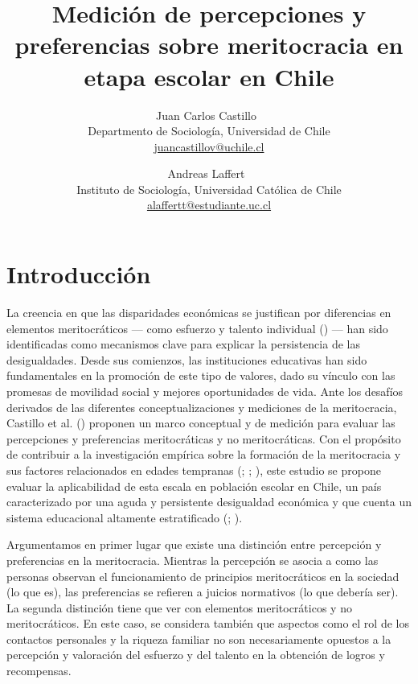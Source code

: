\documentclass[
  12pt,
  letterpaper,
]{article}
\title{Medición de percepciones y preferencias sobre meritocracia en
etapa escolar en Chile}
\author{
{\large Juan Carlos Castillo~\orcidlink{0000-0003-1265-7854}}%
 \\%
Departmento de Sociología, Universidad de Chile \\%
{\footnotesize \url{juancastillov@uchile.cl}} \and
{\large Andreas Laffert~\orcidlink{0000-0002-9008-2454}}%
 \\%
Instituto de Sociología, Universidad Católica de Chile \\%
{\footnotesize \url{alaffertt@estudiante.uc.cl}} \and
}
\date{}
\newcommand{\published}[1]{%
   \gdef\puB{#1}}
\newcommand{\puB}{}
\begin{document}
\published{\textbf{}}

\maketitle





\section{Introducción}\label{introducciuxf3n}

La creencia en que las disparidades económicas se justifican por
diferencias en elementos meritocráticos --- como esfuerzo y talento
individual () --- han sido
identificadas como mecanismos clave para explicar la persistencia de las
desigualdades. Desde sus comienzos, las instituciones educativas han
sido fundamentales en la promoción de este tipo de valores, dado su
vínculo con las promesas de movilidad social y mejores oportunidades de
vida. Ante los desafíos derivados de las diferentes conceptualizaciones
y mediciones de la meritocracia, Castillo et al.
() proponen un marco
conceptual y de medición para evaluar las percepciones y preferencias
meritocráticas y no meritocráticas. Con el propósito de contribuir a la
investigación empírica sobre la formación de la meritocracia y sus
factores relacionados en edades tempranas
(;
;
), este
estudio se propone evaluar la aplicabilidad de esta escala en población
escolar en Chile, un país caracterizado por una aguda y persistente
desigualdad económica y que cuenta un sistema educacional altamente
estratificado (;
).

Argumentamos en primer lugar que existe una distinción entre percepción
y preferencias en la meritocracia. Mientras la percepción se asocia a
como las personas observan el funcionamiento de principios
meritocráticos en la sociedad (lo que es), las preferencias se refieren
a juicios normativos (lo que debería ser). La segunda distinción tiene
que ver con elementos meritocráticos y no meritocráticos. En este caso,
se considera también que aspectos como el rol de los contactos
personales y la riqueza familiar no son necesariamente opuestos a la
percepción y valoración del esfuerzo y del talento en la obtención de
logros y recompensas.
\end{document}
